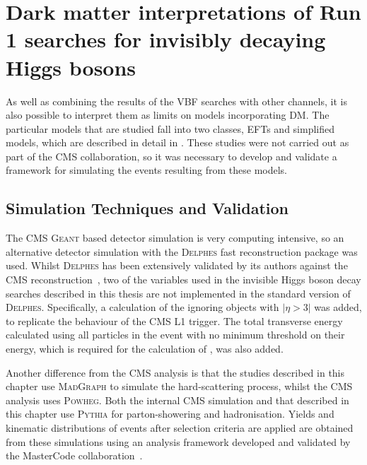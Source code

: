 \chapter{Dark matter interpretations of Run 1 searches for invisibly decaying Higgs bosons}
\label{chap:interp}
As well as combining the results of the \ac{VBF} searches with other channels, it is also possible to interpret them as limits on models incorporating \ac{DM}. The particular models that are studied fall into two classes, \ac{EFT}s and simplified models, which are described in detail in . These studies were not carried out as part of the CMS collaboration, so it was necessary to develop and validate a framework for simulating the events resulting from these models.


\section{Simulation Techniques and Validation}
\label{sec:dmval}
The CMS \textsc{Geant} based detector simulation is very computing intensive, so an alternative detector simulation with the \textsc{Delphes} fast reconstruction package was used. Whilst \textsc{Delphes} has been extensively validated by its authors against the CMS reconstruction~\cite{Favereau2014}, two of the variables used in the invisible Higgs boson decay searches described in this thesis are not implemented in the standard version of \textsc{Delphes}. Specifically, a calculation of the \MET ignoring objects with $|\eta>3|$ was added, to replicate the behaviour of the CMS \ac{L1} trigger. The total transverse energy calculated using all particles in the event with no minimum threshold on their energy, which is required for the calculation of \METsig, was also added.

Another difference from the CMS analysis is that the studies described in this chapter use \textsc{MadGraph} to simulate the hard-scattering process, whilst the CMS analysis uses \textsc{Powheg}. Both the internal CMS simulation and that described in this chapter use \textsc{Pythia} for parton-showering and hadronisation. Yields and kinematic distributions of events after selection criteria are applied are obtained from these simulations using an analysis framework developed and validated by the MasterCode collaboration~\cite{deVries:2015hva}.

